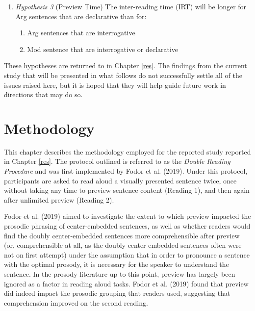 \documentclass[11pt,oneside]{book}
\providecommand{\tightlist}{%
  \setlength{\itemsep}{0pt}\setlength{\parskip}{0pt}}
\begin{document}
\begin{enumerate}
\def\labelenumi{(\arabic{enumi})}
\setcounter{enumi}{30}
\tightlist
\item
  \emph{Hypothesis 3} (Preview Time) \linebreak\nopagebreak
  The inter-reading time (IRT) will be longer for Arg sentences that are declarative than for:

  \begin{enumerate}
  \def\labelenumii{\alph{enumii}.}
  \tightlist
  \item
    Arg sentences that are interrogative
  \item
    Mod sentence that are interrogative or declarative
  \end{enumerate}
\end{enumerate}

These hypotheses are returned to in Chapter \ref{res}. The findings from the current study that will be presented in what follows do not successfully settle all of the issues raised here, but it is hoped that they will help guide future work in directions that may do so.

\hypertarget{method}{%
\chapter{Methodology}\label{method}}

\setlength\parindent{24pt}\setlength{\parskip}{0.0pt plus 1.0pt}

This chapter describes the methodology employed for the reported study reported in Chapter \ref{res}. The protocol outlined is referred to as the \emph{Double Reading Procedure} and was first implemented by Fodor et al. (2019). Under this protocol, participants are asked to read aloud a visually presented sentence twice, once without taking any time to preview sentence content (Reading 1), and then again after unlimited preview (Reading 2).

Fodor et al. (2019) aimed to investigate the extent to which preview impacted the prosodic phrasing of center-embedded sentences, as well as whether readers would find the doubly center-embedded sentences more comprehensible after preview (or, comprehensible at all, as the doubly center-embedded sentences often were not on first attempt) under the assumption that in order to pronounce a sentence with the optimal prosody, it is necessary for the speaker to understand the sentence. In the prosody literature up to this point, preview has largely been ignored as a factor in reading aloud tasks. Fodor et al. (2019) found that preview did indeed impact the prosodic grouping that readers used, suggesting that comprehension improved on the second reading.
\end{document}
